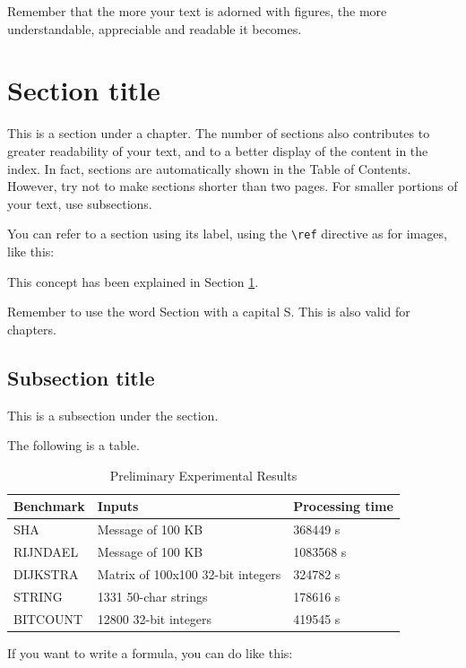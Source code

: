 Remember that the more your text is adorned with figures, the more understandable, appreciable and readable it becomes.

\section{Section title}\label{examplesection}
This is a section under a chapter. The number of sections also contributes to greater readability of your text, and to a better display of the content in the index. In fact, sections are automatically shown in the Table of Contents. However, try not to make sections shorter than two pages. For smaller portions of your text, use subsections.

You can refer to a section using its label, using the \lstinline{\ref} directive as for images, like this:

\begin{center}
This concept has been explained in Section \ref{examplesection}.
\end{center}

Remember to use the word Section with a capital S. This is also valid for chapters. 

\subsection{Subsection title}
This is a subsection under the section. 

The following is a table.

\begin{table}
\centering
\caption{Preliminary Experimental Results}
\begin{tabular}{| p{3cm} | p{3cm} | p{3cm} |}
    \hline
    \textbf{Benchmark} & \textbf{Inputs} & \textbf{Processing time} \\ \hline
    SHA & Message of 100 KB & 368449 s \\ \hline
    RIJNDAEL & Message of 100 KB & 1083568 s \\ \hline
    DIJKSTRA & Matrix of 100x100 32-bit integers & 324782 s \\ \hline
    STRING & 1331 50-char strings & 178616 s \\ \hline
    BITCOUNT & 12800 32-bit integers & 419545 s \\ \hline
    \hline
\end{tabular}
\label{tab:ar}
\end{table}

If you want to write a formula, you can do like this:

